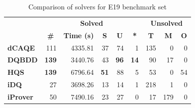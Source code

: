 \documentclass[
  digital, %
  color,
  twoside, %
  table,   %
  nolof,     %
  nolot,     %
]{fithesis3}
\theoremstyle{definition}
\theoremstyle{remark}
\begin{document}
\begin{table}[ht]
\centering
\caption{Comparison of solvers for E19 benchmark set}%
\label{tab:E19}
\begin{tabular}{|l|r|r|r|r|r|r|r|r|}
\hline
\multicolumn{1}{|c|}{}                                  & \multicolumn{5}{c|}{\textbf{Solved}}                                                                                                                                        & \multicolumn{3}{c|}{\textbf{Unsolved}}                                                                 \\  \hhline{~*{8}{-}}
\multicolumn{1}{|c|}{\multirow{-2}{*}{\textbf{Solver}}} & \multicolumn{1}{c|}{\textbf{\#}} & \multicolumn{1}{c|}{\textbf{Time (s)}} & \multicolumn{1}{c|}{\textbf{S}} & \multicolumn{1}{c|}{\textbf{U}} & \multicolumn{1}{c|}{\textbf{*}} & \multicolumn{1}{c|}{\textbf{T}} & \multicolumn{1}{c|}{\textbf{M}} & \multicolumn{1}{c|}{\textbf{O}} \\ \hline
\textbf{dCAQE} & \num{111} & \num{4335.81} & \phantom{0}\num{37} & \phantom{0}\num{74} & \phantom{00}\num{1} & \num{135} & \num{0} & \phantom{00}\num{0} \\ \hline
\textbf{DQBDD} & \textbf{139} & \num{3440.76} & \num{43} & \textbf{96} & \textbf{14} & \num{90} & \num{17} & \num{0} \\ \hline
\textbf{HQS} & \textbf{139} & \num{6796.64} & \textbf{51} & \num{88} & \num{5} & \num{53} & \num{0} & \num{54} \\ \hline
\textbf{iDQ} & \num{27} & \num{3698.26} & \num{13} & \num{14} & \num{1} & \num{218} & \num{1} & \num{0} \\ \hline
\textbf{iProver} & \num{50} & \num{7490.16} & \num{23} & \num{27} & \num{0} & \num{17} & \num{179} & \num{0} \\ \hline
\end{tabular}
\end{table}
\end{document}
